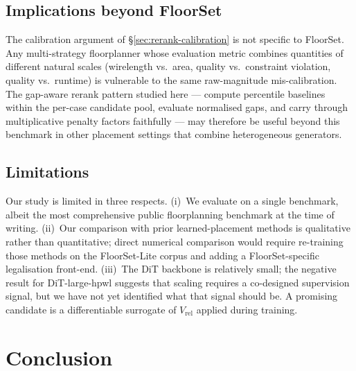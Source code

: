 \documentclass[nolineno]{ieeeaccess}
\begin{document}
\subsection{Implications beyond FloorSet}
The calibration argument of \S\ref{sec:rerank-calibration} is not
specific to FloorSet. Any multi-strategy floorplanner whose
evaluation metric combines quantities of different natural scales
(wirelength vs.~area, quality vs.~constraint violation, quality
vs.~runtime) is vulnerable to the same raw-magnitude mis-calibration.
The gap-aware rerank pattern studied here --- compute percentile
baselines within the per-case candidate pool, evaluate normalised
gaps, and carry through multiplicative penalty factors faithfully ---
may therefore be useful beyond this benchmark in other placement
settings that combine heterogeneous generators.

\subsection{Limitations}
Our study is limited in three respects. (i)~We evaluate on a single
benchmark, albeit the most comprehensive public floorplanning
benchmark at the time of writing. (ii)~Our comparison with prior
learned-placement methods is qualitative rather than quantitative;
direct numerical comparison would require re-training those methods
on the FloorSet-Lite corpus and adding a FloorSet-specific
legalisation front-end. (iii)~The DiT backbone is relatively small;
the negative result for DiT-large-hpwl suggests that scaling requires a
co-designed supervision signal, but we have not yet identified what
that signal should be. A promising candidate is a differentiable
surrogate of $V_{\text{rel}}$ applied during training.

\section{Conclusion}
\label{sec:conclusion}
\end{document}
